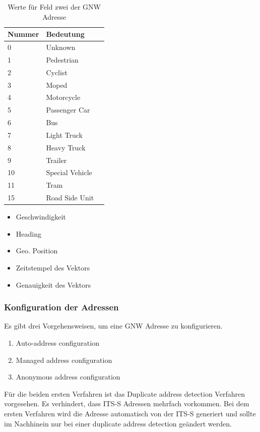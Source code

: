 \begin{table}[h]
\begin{tabular}{lll}
\textbf{Nummer} & \textbf{Bedeutung}  \\ \hline
    0 & Unknown \\
    1 & Pedestrian \\
    2 & Cyclist \\
    3 & Moped \\
    4 & Motorcycle \\
    5 & Passenger Car \\
    6 & Bus \\
    7 & Light Truck \\
    8 & Heavy Truck \\
    9 & Trailer \\
    10 & Special Vehicle \\
    11 & Tram \\
    15 & Road Side Unit \\
\end{tabular}
\caption{Werte für Feld zwei der \acs{GNW} Adresse \cite{etsi302636-4-1}}
\label{tab:typenspezi}
\end{table}

 \begin{itemize}
      	\item Geschwindigkeit
	\item Heading
	\item Geo. Position
	\item Zeitstempel des Vektors
	\item Genauigkeit des Vektors
\end{itemize}

\subsubsection{Konfiguration der Adressen}
Es gibt drei Vorgehensweisen, um eine \acl{GNW} Adresse zu konfigurieren.

\begin{enumerate}
      	\item Auto-address configuration
	\item Managed address configuration
	\item Anonymous address configuration
\end{enumerate}

Für die beiden ersten Verfahren ist das Duplicate address detection Verfahren vorgesehen. Es verhindert, dass \ac{ITS-S} Adressen mehrfach vorkommen.
Bei dem ersten Verfahren wird die Adresse automatisch von der \ac{ITS-S} generiert und sollte im Nachhinein nur bei einer duplicate address detection geändert werden. 

